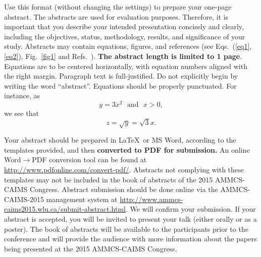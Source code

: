 \documentclass[11pt]{article}
\begin{document}
Use this format (without changing the settings) to prepare your one-page abstract. The abstracts are used for evaluation purposes. Therefore, it is important that you describe  your intended presentation concisely and clearly, including the objectives, status, methodology, results, and significance of your study.
 Abstracts may contain equations, figures, and references (see Eqs.~(\ref{eq1}, \ref{eq2}), Fig.~\ref{fig1} and Refs.~\cite{KR,WK,ABS}). {\bf The abstract length is limited to 1  page}.  Equations are to be centered horizontally, with equation numbers aligned with the right margin.  Paragraph text is full-justified.  Do not explicitly begin by writing the word ``abstract''.  Equations should be properly punctuated.  For instance, as
\begin{equation}
y=3x^2\  \  \  \mbox{and}\  \  \  x>0, \label{eq1}
\end{equation}
we see that
\begin{equation}
z=\sqrt{y}=\sqrt{3}x. \label{eq2}
\end{equation}

Your abstract should be prepared in \LaTeX\ or MS Word, according to the templates provided, and then \textbf{converted to PDF for submission.}  An online Word$\rightarrow$PDF conversion tool can be found at \url{http://www.pdfonline.com/convert-pdf/}.  Abstracts not complying with these templates may not be included in the book of abstracts of the 2015 AMMCS-CAIMS Congress. Abstract submission should be done online via the AMMCS-CAIMS-2015 management system at
\url{http://www.ammcs-caims2015.wlu.ca/submit-abstract.html}. We will confirm your submission. If your abstract is accepted, you will be invited to present your talk (either orally or as a poster).
The book of abstracts will be available to the participants prior to the conference and will provide the audience with more information
about the papers being presented at the 2015 AMMCS-CAIMS Congress.
%
%
\end{document}
